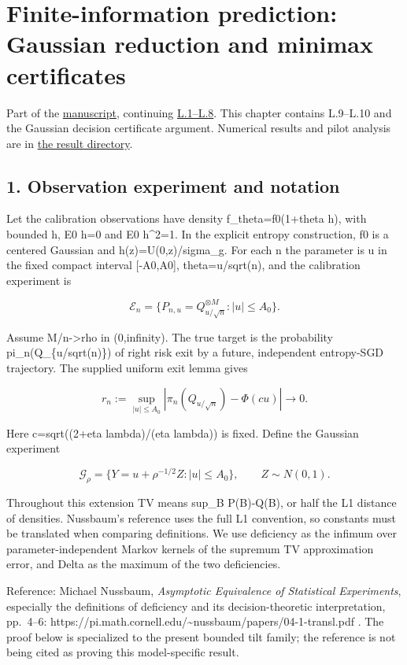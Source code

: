 \section{Finite-information prediction: Gaussian reduction and minimax
certificates}\label{gaussian_decision-finite-information-prediction-gaussian-reduction-and-minimax-certificates}

Part of the \href{DRAFT.md}{manuscript}, continuing
\href{local_prediction.md}{L.1--L.8}. This chapter contains L.9--L.10
and the Gaussian decision certificate argument. Numerical results and
pilot analysis are in
\href{../experiments/results/gaussian_decision/analysis.md}{the result
directory}.

\subsection{1. Observation experiment and
notation}\label{gaussian_decision-observation-experiment-and-notation}

Let the calibration observations have density f\_theta=f0(1+theta h),
with bounded h, E0 h=0 and E0 h\^{}2=1. In the explicit entropy
construction, f0 is a centered Gaussian and h(z)=U(0,z)/sigma\_g. For
each n the parameter is u in the fixed compact interval {[}-A0,A0{]},
theta=u/sqrt(n), and the calibration experiment is

\[
\mathcal E_n=\{P_{n,u}=Q_{u/\sqrt n}^{\otimes M}:|u|\le A_0\}.
\]

Assume M/n-\textgreater rho in (0,infinity). The true target is the
probability pi\_n(Q\_\{u/sqrt(n)\}) of right risk exit by a future,
independent entropy-SGD trajectory. The supplied uniform exit lemma
gives

\[
r_n:=\sup_{|u|\le A_0}|\pi_n(Q_{u/\sqrt n})-\Phi(cu)|\to0.
\]

Here c=sqrt((2+eta lambda)/(eta lambda)) is fixed. Define the Gaussian
experiment

\[
\mathcal G_\rho=\{Y=u+\rho^{-1/2}Z:|u|\le A_0\},\qquad Z\sim N(0,1).
\]

Throughout this extension TV means sup\_B \textbar P(B)-Q(B)\textbar, or
half the L1 distance of densities. Nussbaum's reference uses the full L1
convention, so constants must be translated when comparing definitions.
We use deficiency as the infimum over parameter-independent Markov
kernels of the supremum TV approximation error, and Delta as the maximum
of the two deficiencies.

Reference: Michael Nussbaum, \emph{Asymptotic Equivalence of Statistical
Experiments}, especially the definitions of deficiency and its
decision-theoretic interpretation, pp.~4--6:
https://pi.math.cornell.edu/\textasciitilde nussbaum/papers/04-1-transl.pdf
. The proof below is specialized to the present bounded tilt family; the
reference is not being cited as proving this model-specific result.

